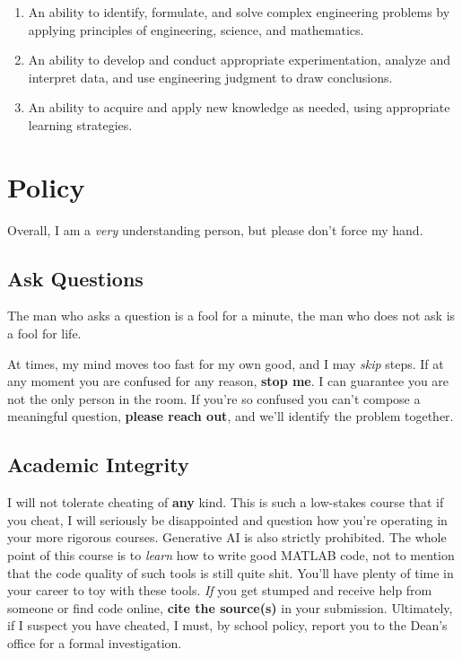 \documentclass{article}
\begin{document}
\begin{enumerate}
	\slshape

	\item
		An ability to identify, formulate, and solve complex
		engineering problems by applying principles of
		engineering, science, and mathematics.

	\setcounter{enumi}{5}

	\item
		An ability to develop and conduct appropriate
		experimentation, analyze and interpret data, and use
		engineering judgment to draw conclusions.

	\item
		An ability to acquire and apply new knowledge as needed,
		using appropriate learning strategies.
\end{enumerate}

\section{Policy}

Overall, I am a \emph{very} understanding person, but please don't force
my hand.

\subsection{Ask Questions}

\begin{displayquote}[Confucius]
	The man who asks a question is a fool for a minute, the man who
	does not ask is a fool for life.
\end{displayquote}

\noindent
At times, my mind moves too fast for my own good, and I may \emph{skip}
steps.  If at any moment you are confused for any reason, \textbf{stop
me}.  I can guarantee you are not the only person in the room.  If
you're so confused you can't compose a meaningful question,
\textbf{please reach out}, and we'll identify the problem together.

\subsection{Academic Integrity}

I will not tolerate cheating of \textbf{any} kind.  This is such a
low-stakes course that if you cheat, I will seriously be disappointed
and question how you're operating in your more rigorous courses.
Generative AI is also strictly prohibited.  The whole point of this
course is to \emph{learn} how to write good MATLAB code, not to mention
that the code quality of such tools is still quite shit.  You'll have
plenty of time in your career to toy with these tools.  \emph{If} you
get stumped and receive help from someone or find code online,
\textbf{cite the source(s)} in your submission.  Ultimately, if I
suspect you have cheated, I must, by school policy, report you to the
Dean's office for a formal investigation.
\end{document}
